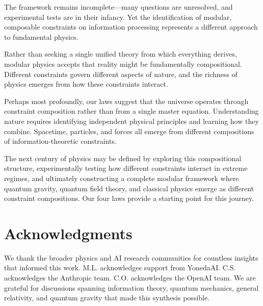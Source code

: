 \documentclass[11pt,a4paper]{article}
\theoremstyle{plain}
\theoremstyle{definition}
\theoremstyle{remark}
\begin{document}
The framework remains incomplete—many questions are unresolved, and experimental tests are in their infancy. Yet the identification of modular, composable constraints on information processing represents a different approach to fundamental physics.

Rather than seeking a single unified theory from which everything derives, modular physics accepts that reality might be fundamentally compositional. Different constraints govern different aspects of nature, and the richness of physics emerges from how these constraints interact.

Perhaps most profoundly, our laws suggest that the universe operates through constraint composition rather than from a single master equation. Understanding nature requires identifying independent physical principles and learning how they combine. Spacetime, particles, and forces all emerge from different compositions of information-theoretic constraints.

The next century of physics may be defined by exploring this compositional structure, experimentally testing how different constraints interact in extreme regimes, and ultimately constructing a complete modular framework where quantum gravity, quantum field theory, and classical physics emerge as different constraint compositions. Our four laws provide a starting point for this journey.

\section*{Acknowledgments}

We thank the broader physics and AI research communities for countless insights that informed this work. M.L. acknowledges support from YonedaAI. C.S. acknowledges the Anthropic team. C.O. acknowledges the OpenAI team. We are grateful for discussions spanning information theory, quantum mechanics, general relativity, and quantum gravity that made this synthesis possible.
\end{document}

